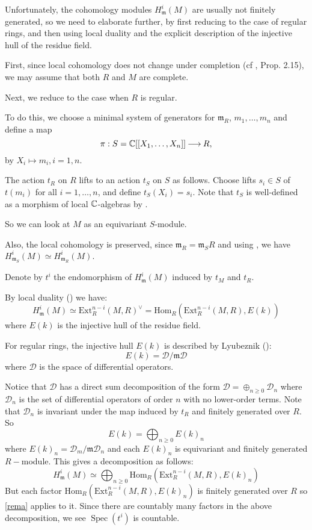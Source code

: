 \documentclass[11pt]{article}
\numberwithin{equation}{section}
\newcommand{\arrow}{{\:\longrightarrow\:}}
\newcommand{\C}{{\Bbb C}}
\newcommand{\6}{\partial}
\renewcommand{\geq}{\geqslant}
\newcommand{\Spec}{\operatorname{Spec}}
\def\ra{\arrow}
\def\m{\mathfrak m}
\def\blacksquare{\hbox{\vrule width 5pt height 5pt depth 0pt}}
\def\endproof{\blacksquare}
\begin{document}
Unfortunately, the cohomology modules $H^i_{\m}(M)$ are usually not finitely generated, so we need to elaborate further, by first reducing to the case of regular rings, and then using local duality and the explicit description of the injective hull of the residue field.

First, since local cohomology does not change under completion (cf \cite{Hun}, Prop. 2.15),  we may assume that both $R$ and $M$ are complete. 

Next, we reduce  to the case when $R$ is regular.


To do this, we choose a minimal system of generators for $\m_R$,  $m_1,\ldots, m_n$ and define a map
$$\pi:S=\C[[X_1,\dots, X_n]]\ra R,$$ 
by $X_i\mapsto m_i, i=1,n.$

The action $t_R$ on $R$  lifts to  an action $t_S$ on $S$ as follows. Choose lifts $s_i\in S$ of $t(m_i)$ for all $i=1,\dots,n$, and define $t_S(X_i)=s_i$. Note that $t_S$ is well-defined as a morphism of local $\C$-algebras by \cite[Theorem 7.16]{eis}.

So we can look at $M$ as an equivariant $S$-module.

Also, the local cohomology is preserved, 
since $\m_R=\m_SR $ and  using \cite[Proposition 2.14 (2)]{Hun},  we have
$H^i_{\m_S}(M)\simeq H^i_{\m_R}(M).$

Denote by $t^i$ the endomorphism of $H^i_\m(M)$ induced by $t_M$ and $t_R$.

By local duality (\cite[Theorem 4.4]{Hun}) we have:
$$H^i_{\m}(M)\simeq \mathrm{Ext}^{n-i}_R(M, R)^{\vee}=\mathrm{Hom}_R(\mathrm{Ext}^{n-i}_R(M, R), E(k))$$
where $E(k)$ is the injective hull of the residue field.

For regular rings, the injective hull $E(k)$ is described by Lyubeznik (\cite{_liu_}):
$$E(k)={\mathcal D}/\mathfrak m{\mathcal D}$$
where ${\mathcal D}$ is the space of differential operators.

Notice that ${\mathcal D}$ has a direct sum decomposition of the form
${\mathcal D}=\oplus_{n\geq 0} {\mathcal D}_n$
where ${\mathcal D}_n$ is the set of differential operators of order $n$ with no lower-order terms. Note that $\mathcal{D}_n$  is invariant under the map induced by $t_R$ and finitely generated over $R.$
So
$$E(k)=\bigoplus_{n\geq 0}E(k)_n$$ 
where $E(k)_n={\mathcal D}_m/\m {\mathcal D}_n$ and each $E(k)_n$ is  equivariant  and finitely generated $R-$module. This gives a decomposition as  follows:
$$H^i_{\m}(M)\simeq\bigoplus_{n\geq 0}\mathrm{Hom}_R(\mathrm{Ext}^{n-i}_R(M, R), E(k)_n)$$ 
But  each  factor  $\mathrm{Hom}_R(\mathrm{Ext}^{n-i}_R(M, R), E(k)_n)$ is finitely generated over $R$ so 
\ref{rema} applies to it.  Since there are countably many factors in the above decomposition, we see $\Spec(t^i)$ is countable. 
\hfill\endproof
\end{document}
